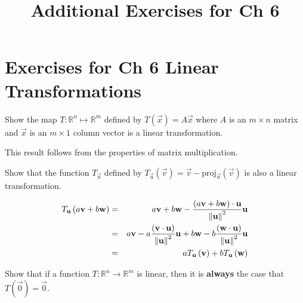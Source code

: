 \documentclass{ximera}
\title{Additional Exercises for Ch 6} \license{CC BY-NC-SA 4.0}
\begin{document}
\begin{abstract}
\end{abstract}
\maketitle

\section*{Exercises for Ch 6 Linear Transformations}





\begin{problem}\label{prb:6.1} Show the map $T:\mathbb{R}^{n}\mapsto \mathbb{R}^{m}$ defined by
$T\left( \vec{x} \right) =A\vec{x}$ where $A$ is an $m\times n$ matrix
and $\vec{x}$ is an $m\times 1$ column vector is a linear transformation.
\begin{hint}
This result follows from the properties of matrix multiplication.
\end{hint}
\end{problem}

\begin{problem}\label{prb:6.2} Show that the function $T_{\vec{u}}$ defined by $T_{\vec{u}}
\left( \vec{v}\right) = \vec{v}-\mbox{proj}_{\vec{u}}\left(
\vec{v}\right) $ is also a linear transformation.
\begin{hint}
\begin{eqnarray*}
T_{\mathbf{u}}\left( a\mathbf{v}+b\mathbf{w}\right) &=&a\mathbf{v}+b\mathbf{w}-\frac{\left( a\mathbf{v}+b\mathbf{w}\right)\cdot \mathbf{u} }{\left\lVert \mathbf{u}
\right\rVert ^{2}}\mathbf{u} \\
&=&a\mathbf{v}-a\frac{\left( \mathbf{v}\cdot \mathbf{u}\right) }{\left\lVert \mathbf{u} \right\rVert ^{2}}\mathbf{u}+b\mathbf{w}-b\frac{\left( \mathbf{w}\cdot \mathbf{u}
\right) }{\left\lVert \mathbf{u}\right\rVert ^{2}}\mathbf{u} \\
&=&aT_{\mathbf{u}}\left( \mathbf{v}\right) +bT_{\mathbf{u}}\left( \mathbf{w}
\right)
\end{eqnarray*}
\end{hint}
\end{problem}

\begin{problem}\label{prb:6.4} Show that if a function $T:\mathbb{R}^{n}\rightarrow \mathbb{R}^{m}$
is linear, then it is \textbf{always }the case that $T\left(\vec{0}\right) = \vec{0}$.
\end{problem}
\end{document}
